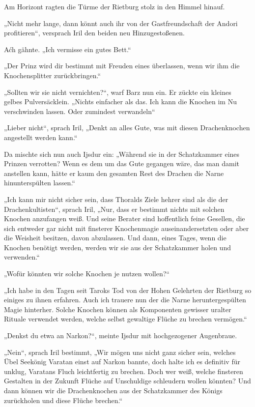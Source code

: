Am Horizont ragten die Türme der Rietburg stolz in den Himmel hinauf.

„Nicht mehr lange, dann könnt auch ihr von der Gastfreundschaft der Andori profitieren“, versprach Iril den beiden neu Hinzugestoßenen.

Aćh gähnte. „Ich vermisse ein gutes Bett.“

„Der Prinz wird dir bestimmt mit Freuden eines überlassen, wenn wir ihm die Knochensplitter zurückbringen.“

„Sollten wir sie nicht vernichten?“, warf Barz nun ein. Er zückte ein kleines gelbes Pulversäcklein. „Nichts einfacher als das. Ich kann die Knochen im Nu verschwinden lassen. Oder zumindest verwandeln“

„Lieber nicht“, sprach Iril, „Denkt an alles Gute, was mit diesen Drachenknochen angestellt werden kann.“

Da mischte sich nun auch Ijsdur ein: „Während sie in der Schatzkammer eines Prinzen verrotten? Wenn es dem um das Gute gegangen wäre, das man damit anstellen kann, hätte er kaum den gesamten Rest des Drachen die Narne hinunterspülten lassen.“

„Ich kann mir nicht sicher sein, dass Thoralds Ziele hehrer sind als die der Drachenkultisten“, sprach Iril, „Nur, dass er bestimmt nichts mit solchen Knochen anzufangen weiß. Und seine Berater sind hoffentlich feine Gesellen, die sich entweder gar nicht mit finsterer Knochenmagie auseinandersetzten oder aber die Weisheit besitzen, davon abzulassen. Und dann, eines Tages, wenn die Knochen benötigt werden, werden wir sie aus der Schatzkammer holen und verwenden.“

„Wofür könnten wir solche Knochen je nutzen wollen?“

„Ich habe in den Tagen seit Taroks Tod von der Hohen Gelehrten der Rietburg so einiges zu ihnen erfahren. Auch ich trauere nun der die Narne heruntergespülten Magie hinterher. Solche Knochen können als Komponenten gewisser uralter Rituale verwendet werden, welche selbst gewaltige Flüche zu brechen vermögen.“

„Denkst du etwa an Narkon?“, meinte Ijsdur mit hochgezogener Augenbraue.

„Nein“, sprach Iril bestimmt, „Wir mögen uns nicht ganz sicher sein, welches Übel Seekönig Varatan einst auf Narkon bannte, doch halte ich es definitiv für unklug, Varatans Fluch leichtfertig zu brechen. Doch wer weiß, welche finsteren Gestalten in der Zukunft Flüche auf Unschuldige schleudern wollen könnten? Und dann können wir die Drachenknochen aus der Schatzkammer des Königs zurückholen und diese Flüche brechen.“



